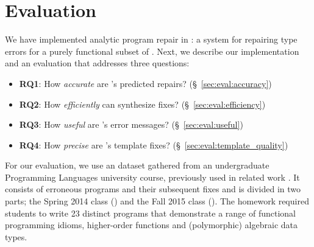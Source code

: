\section{Evaluation}
\label{sec:eval}

\lstMakeShortInline[mathescape=true]{|}

We have implemented analytic program repair in \toolname: a system for
repairing type errors for a purely functional subset of \ocaml. Next,
we describe our implementation and an evaluation that addresses three
questions:

\begin{itemize}
    \item \textbf{RQ1}: How \emph{accurate} are \toolname's predicted repairs?
                        (\S~\ref{sec:eval:accuracy})
    \item \textbf{RQ2}: How \emph{efficiently} can \toolname synthesize fixes?
                        (\S~\ref{sec:eval:efficiency})
    \item \textbf{RQ3}: How \emph{useful} are \toolname's error messages?
                        (\S~\ref{sec:eval:useful})
    \item \textbf{RQ4}: How \emph{precise} are \toolname's template fixes?
                        (\S~\ref{sec:eval:template_quality})

\end{itemize}


%
For our evaluation, we use an \ocaml dataset gathered from an undergraduate
Programming Languages university course, previously used in related work
\citep{Seidel2017-ko,Seidel:2017}. It consists of erroneous programs and their
subsequent fixes and is divided in two parts; the Spring 2014 class (\SPRING)
and the Fall 2015 class (\FALL). The homework required students to write 23
distinct programs that demonstrate a range of functional programming idioms, \eg
higher-order functions and (polymorphic) algebraic data types.

